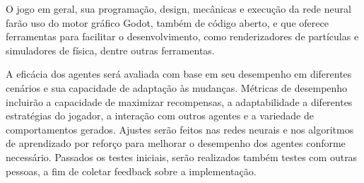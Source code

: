 O jogo em geral, sua programação, design, mecânicas e execução da rede neural farão uso do motor gráfico Godot, também de código aberto, e que oferece ferramentas para facilitar o desenvolvimento, como renderizadores de partículas e simuladores de física, dentre outras ferramentas.

A eficácia dos agentes será avaliada com base em seu desempenho em diferentes cenários e sua capacidade de adaptação às mudanças. Métricas de desempenho incluirão a capacidade de maximizar recompensas, a adaptabilidade a diferentes estratégias do jogador, a interação com outros agentes e a variedade de comportamentos gerados. Ajustes serão feitos nas redes neurais e nos algoritmos de aprendizado por reforço para melhorar o desempenho dos agentes conforme necessário. Passados os testes iniciais, serão realizados também testes com outras pessoas, a fim de coletar feedback sobre a implementação.